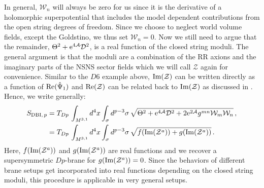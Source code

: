 \documentclass[a4paper,12pt,twoside,openright]{report}
\newcommand{\bea}{\begin{equation}\begin{aligned}}
\newcommand{\eea}{\end{aligned}\end{equation}}
\def\rme{{\rm e}}
\def\rmre{{\rm Re}}
\def\rmim{{\rm Im}}
\begin{document}
In general, $\mathcal{W}_n$ will always be zero for us since it is the derivative of a holomorphic superpotential that includes the model dependent contributions from the open string degrees of freedom. Since we choose to neglect world volume fields, except the Goldstino, we thus set $\mathcal{W}_n = 0$. Now we still need to argue that the remainder, $\Theta^2 + \rme^{4\mathcal{A}} \mathcal{D}^2$, is a real function of the closed string moduli. The general argument is that the moduli are a combination of the RR axions and the imaginary parts of the NSNS sector fields which we will call $\mathcal{Z}$ again for convenience. Similar to the $D6$ example above, $\rmim(\mathcal{Z})$ can be written directly as a function of $\rmre(\hat{\Psi}_1)$ and $\rmre(\mathcal{Z})$ can be related back to $\rmim(\mathcal{Z})$ as discussed in \cite{Grana:2005jc}. Hence, we write generally:
\bea 
S_{\text{DBI},\,p} &= T_{Dp} \, \int_{M^{3,1}} d^4x \int_\sigma d^{p-3}\sigma \, \sqrt{\Theta^2 + \rme^{4\mathcal{A}} \mathcal{D}^2 + 2 \rme^{2\mathcal{A}} g^{mn} \mathcal{W}_m \mathcal{W}_n}\,,\\
&= T_{Dp} \, \int_{M^{3,1}} d^4x \int_\sigma d^{p-3}\sigma \, \sqrt{ f(\rmim(\mathcal{Z}^a))+g(\rmim(\mathcal{Z}^a))}\,.
\eea
Here, $f(\rmim(\mathcal{Z}^a))$ and $g(\rmim(\mathcal{Z}^a))$ are real functions and we recover a supersymmetric $Dp$-brane for $g(\rmim(\mathcal{Z}^a)) = 0$. Since the behaviors of different brane setups get incorporated into real functions depending on the closed string moduli, this procedure is applicable in very general setups.
\end{document}
